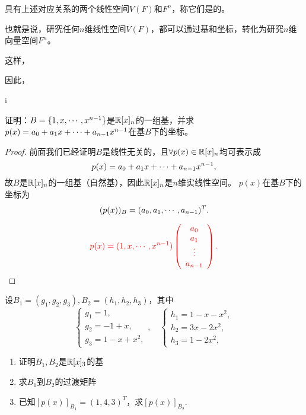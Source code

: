 \begin{frame}
具有上述对应关系的两个线性空间$V(F)$和$F^n$，称它们是的。 \vspace{.1in}\pause

也就是说，研究任何$n$维线性空间$V(F)$，都可以通过基和坐标，转化为研究$n$维向量空间$F^n$。\vspace{.1in}\pause

这样，
\vspace{.1in}\pause

因此，
\end{frame}

\begin{frame}i
  \begin{li}
    证明：$B=\{1,x,\cdots,x^{n-1}\}$是$\mathbb R[x]_n$的一组基，并求$p(x)=a_0+a_1x+\cdots+a_{n-1}x^{n-1}$在基$B$下的坐标。
  \end{li}\pause 
  \begin{proof}
    前面我们已经证明$B$是线性无关的，且$\forall p(x) \in \mathbb R[x]_n$均可表示成
    $$
    p(x)= a_0+a_1x+\cdots+a_{n-1}x^{n-1},
    $$
    故$B$是$\mathbb R[x]_n$的一组基（自然基），因此$\mathbb R[x]_n$是$n$维实线性空间。 
    $p(x)$在基$B$下的坐标为
    $$
    (p(x))_B=(a_0,a_1,\cdots,a_{n-1})^T.
    $$  
    \vspace{.1in}\pause 
    
    $$
    \textcolor{red}{
    p(x) = (1, x, \cdots, x^{n-1}) 
    \left( \begin{array}{c} a_0\\ a_1\\ \vdots\\ a_{n-1} \end{array}\right).
    }
    $$
    
  \end{proof}
\end{frame}

\begin{frame}
  \begin{li}
    设$B_1=(g_1, g_2, g_3),B_2=(h_1, h_2, h_3)$，其中
    $$
    \left\{
      \begin{array}{l}
        g_1 = 1,\\
        g_2 = -1+x, \\
        g_3 = 1-x+x^2,
      \end{array}   
      \right., \quad
      \left\{
      \begin{array}{l}
        h_1 = 1-x-x^2,\\
        h_2 = 3x-2x^2, \\
        h_3 = 1-2x^2,
      \end{array}
    \right.
    $$
    \begin{enumerate}
    \item 证明$B_1,B_2$是$\mathbb R[x]_3$的基
    \item 求$B_1$到$B_2$的过渡矩阵
    \item 已知$[p(x)]_{B_1} = (1,4,3)^T$，求$[p(x)]_{B_2}$.
    \end{enumerate}
  \end{li}
\end{frame}

